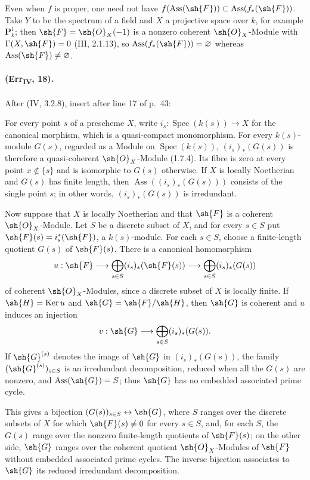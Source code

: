 \begin{remark}[3.1.10.5]
Even when $f$ is proper, one need not have
$f(\operatorname{Ass}(\sh{F}))\subset
\operatorname{Ass}(f_*(\sh{F}))$.  Take $Y$ to be the spectrum of a
field and $X$ a projective space over $k$, for example $\mathbf P^1_k$;
then $\sh{F}=\sh{O}_X(-1)$ is a nonzero coherent $\sh{O}_X$-Module with
$\Gamma(X,\sh{F})=0$ (III, 2.1.13), so
$\operatorname{Ass}(f_*(\sh{F}))=\varnothing$ whereas
$\operatorname{Ass}(\sh{F})\neq\varnothing$.
\end{remark}

\paragraph{(Err\textsubscript{IV}, 18).}
After (IV, 3.2.8), insert after line 17 of p.~43:

\begin{remark}[3.2.9]
For every point $s$ of a prescheme $X$, write
$i_s:\operatorname{Spec}(k(s))\to X$ for the canonical morphism, which
is a quasi-compact monomorphism.  For every $k(s)$-module $G(s)$,
regarded as a Module on $\operatorname{Spec}(k(s))$,
$(i_s)_*(G(s))$ is therefore a quasi-coherent $\sh{O}_X$-Module
(1.7.4).  Its fibre is zero at every point
$x\notin\overline{\{s\}}$ and is isomorphic to $G(s)$ otherwise.  If
$X$ is locally Noetherian and $G(s)$ has finite length, then
$\operatorname{Ass}((i_s)_*(G(s)))$ consists of the single point $s$;
in other words, $(i_s)_*(G(s))$ is irredundant.

Now suppose that $X$ is locally Noetherian and that $\sh{F}$ is a
coherent $\sh{O}_X$-Module.  Let $S$ be a discrete subset of $X$, and
for every $s\in S$ put $\sh{F}(s)=i_s^*(\sh{F})$, a $k(s)$-module.
For each $s\in S$, choose a finite-length quotient $G(s)$ of
$\sh{F}(s)$.  There is a canonical homomorphism
\[
 u:\sh{F}\longrightarrow
 \bigoplus_{s\in S}(i_s)_*(\sh{F}(s))\longrightarrow
 \bigoplus_{s\in S}(i_s)_*(G(s))
\]
of coherent $\sh{O}_X$-Modules, since a discrete subset of $X$ is
locally finite.  If $\sh{H}=\operatorname{Ker}u$ and
$\sh{G}=\sh{F}/\sh{H}$, then $\sh{G}$ is coherent and $u$ induces an
injection
\[
 v:\sh{G}\longrightarrow\bigoplus_{s\in S}(i_s)_*(G(s)).
\]
If $\sh{G}^{(s)}$ denotes the image of $\sh{G}$ in
$(i_s)_*(G(s))$, the family $(\sh{G}^{(s)})_{s\in S}$ is an
irredundant decomposition, reduced when all the $G(s)$ are nonzero, and
$\operatorname{Ass}(\sh{G})=S$; thus $\sh{G}$ has no embedded
associated prime cycle.

This gives a bijection $(G(s))_{s\in S}\leftrightarrow\sh{G}$, where
$S$ ranges over the discrete subsets of $X$ for which
$\sh{F}(s)\neq0$ for every $s\in S$, and, for each $S$, the $G(s)$
range over the nonzero finite-length quotients of $\sh{F}(s)$; on the
other side, $\sh{G}$ ranges over the coherent quotient
$\sh{O}_X$-Modules of $\sh{F}$ without embedded associated prime
cycles.  The inverse bijection associates to $\sh{G}$ its reduced
irredundant decomposition.
\end{remark}

